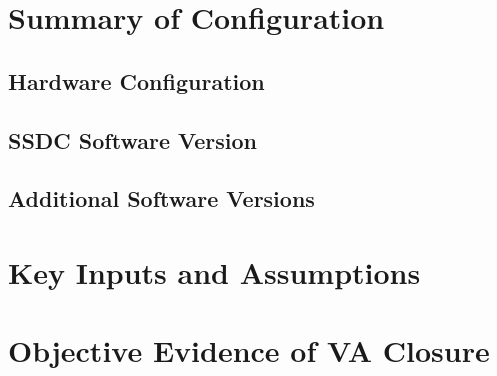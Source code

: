\documentclass[TR]{spherex}
\begin{document}
\section{Summary of Configuration} %

\subsection{Hardware Configuration}

\subsection{SSDC Software Version}

\subsection{Additional Software Versions} %

\section{Key Inputs and Assumptions} %


\section{Objective Evidence of VA Closure}

\end{document}
